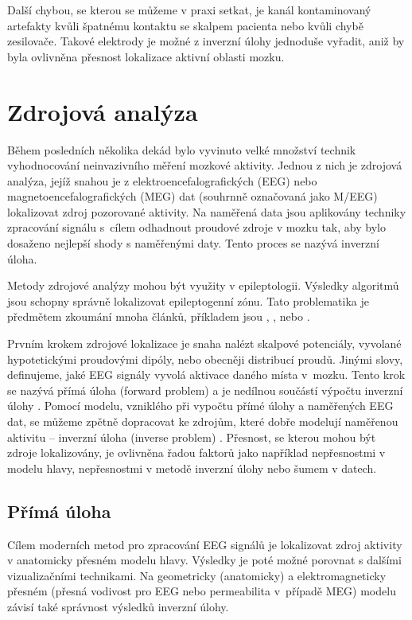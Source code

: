 Další chybou, se kterou se můžeme v praxi setkat, je kanál kontaminovaný artefakty kvůli špatnému kontaktu se skalpem pacienta nebo kvůli chybě zesilovače. Takové elektrody je možné z inverzní úlohy jednoduše vyřadit, aniž by byla ovlivněna přesnost lokalizace aktivní oblasti mozku. \cite{29}





\section{Zdrojová analýza}
Během posledních několika dekád bylo vyvinuto velké množství technik vyhodnocování neinvazivního měření mozkové aktivity. Jednou z nich je zdrojová analýza, jejíž snahou je z elektroencefalografických (EEG) nebo magnetoencefalografických (MEG) dat (souhrnně označovaná jako M/EEG) lokalizovat zdroj pozorované aktivity. Na naměřená data jsou aplikovány techniky zpracování signálu s~cílem odhadnout proudové zdroje v mozku tak, aby bylo dosaženo nejlepší shody s naměřenými daty. Tento proces se nazývá inverzní úloha. \cite{20}

Metody zdrojové analýzy mohou být využity v epileptologii. Výsledky algoritmů jsou schopny správně lokalizovat epileptogenní zónu. Tato problematika je předmětem zkoumání mnoha článků, příkladem jsou \cite{59}, \cite{60}, \cite{62} nebo \cite{33}.

Prvním krokem zdrojové lokalizace je snaha nalézt skalpové potenciály, vyvolané hypotetickými proudovými dipóly, nebo obecněji distribucí proudů. Jinými slovy, definujeme, jaké EEG signály vyvolá aktivace daného místa v~mozku. Tento krok se nazývá přímá úloha (forward problem) a je nedílnou součástí výpočtu inverzní úlohy \cite{19}. Pomocí modelu, vzniklého při vypočtu přímé úlohy a naměřených EEG dat, se můžeme zpětně dopracovat ke zdrojům, které dobře modelují naměřenou aktivitu – inverzní úloha (inverse problem) \cite{20}. Přesnost, se kterou mohou být zdroje lokalizovány, je ovlivněna řadou faktorů jako například nepřesnostmi v modelu hlavy, nepřesnostmi v metodě inverzní úlohy nebo šumem v datech. \cite{20,23}


\subsection{Přímá úloha}
\label{primaUloha}
Cílem moderních metod pro zpracování EEG signálů je lokalizovat zdroj aktivity v anatomicky přesném modelu hlavy. Výsledky je poté možné porovnat s dalšími vizualizačními technikami. Na geometricky (anatomicky) a elektromagneticky přesném (přesná vodivost pro EEG nebo permeabilita v~případě MEG) modelu závisí také správnost výsledků inverzní úlohy. \cite{29} 

